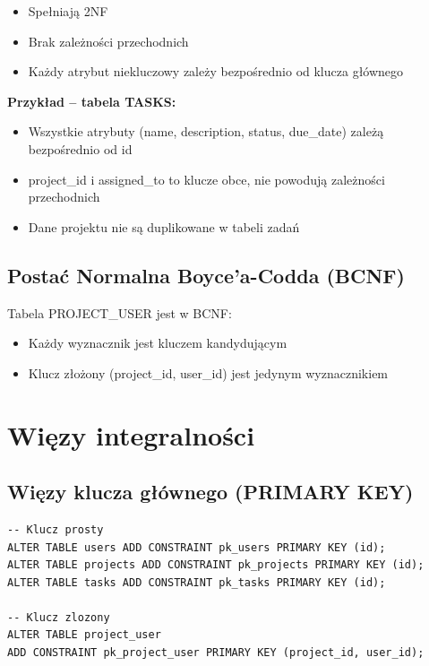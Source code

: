 \documentclass[12pt,a4paper]{report}
\begin{document}
\begin{itemize}
    \item Spełniają 2NF
    \item Brak zależności przechodnich
    \item Każdy atrybut niekluczowy zależy bezpośrednio od klucza głównego
\end{itemize}

\textbf{Przykład -- tabela TASKS:}
\begin{itemize}
    \item Wszystkie atrybuty (name, description, status, due\_date) zależą bezpośrednio od id
    \item project\_id i assigned\_to to klucze obce, nie powodują zależności przechodnich
    \item Dane projektu nie są duplikowane w tabeli zadań
\end{itemize}

\subsection{Postać Normalna Boyce'a-Codda (BCNF)}

Tabela PROJECT\_USER jest w BCNF:
\begin{itemize}
    \item Każdy wyznacznik jest kluczem kandydującym
    \item Klucz złożony (project\_id, user\_id) jest jedynym wyznacznikiem
\end{itemize}

\section{Więzy integralności}

\subsection{Więzy klucza głównego (PRIMARY KEY)}

\begin{lstlisting}[style=sqlstyle, caption={Definicje kluczy głównych}]
-- Klucz prosty
ALTER TABLE users ADD CONSTRAINT pk_users PRIMARY KEY (id);
ALTER TABLE projects ADD CONSTRAINT pk_projects PRIMARY KEY (id);
ALTER TABLE tasks ADD CONSTRAINT pk_tasks PRIMARY KEY (id);

-- Klucz zlozony
ALTER TABLE project_user 
ADD CONSTRAINT pk_project_user PRIMARY KEY (project_id, user_id);
\end{lstlisting}
\end{document}
